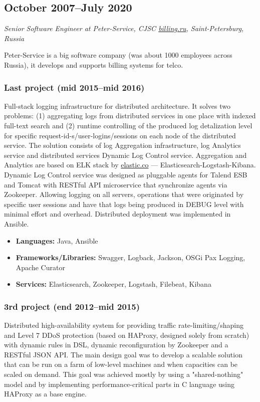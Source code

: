\subsection*{October 2007--July 2020}

\textit{Senior Software Engineer at Peter-Service, CJSC \href{https://billing.ru}{billing.ru}, Saint-Petersburg, Russia}

Peter-Service is a big software company (was about 1000 employees across Russia), it develops and supports billing systems for telco.

\subsubsection*{Last project (mid 2015--mid 2016)}
Full-stack logging infrastructure for distributed architecture. It solves two problems: (1) aggregating logs from distributed services in one
place with indexed full-text search and (2) runtime controlling of the produced log detalization level for specific
request-id-s/user-logins/sessions on each node of the distributed service. The solution consists of log Aggregation infrastructure, log Analytics
service and distributed services Dynamic Log Control service. Aggregation and Analytics are based on ELK stack by
\href{https://elastic.co}{elastic.co} --- Elasticsearch-Logstash-Kibana. Dynamic Log Control service was designed as pluggable agents for
Talend ESB and Tomcat with RESTful API microservice that synchronize agents via Zookeeper. Allowing logging on all servers, operations that were
originated by specific user sessions and have that logs being produced in DEBUG level with minimal effort and overhead. Distributed deployment
was implemented in Ansible.

\begin{itemize}[noitemsep, nosep]
  \item \textbf{Languages:} Java, Ansible
  \item \textbf{Frameworks/Libraries:} Swagger, Logback, Jackson, OSGi Pax Logging, Apache Curator
  \item \textbf{Services:} Elasticsearch, Zookeeper, Logstash, Filebeat, Kibana
\end{itemize}

\subsubsection*{3rd project (end 2012--mid 2015)}
Distributed high-availability system for providing traffic rate-limiting/shaping and Level 7 DDoS protection (based on HAProxy, designed solely
from scratch) with dynamic rules in DSL, dynamic reconfiguration by Zookeeper and a RESTful JSON API. The main design goal was to develop a scalable
 solution that can be run on a farm of low-level machines and when capacities can be scaled on demand. This goal was achieved mostly by using a
 "shared-nothing" model and by implementing performance-critical parts in C language using HAProxy as a base engine.

